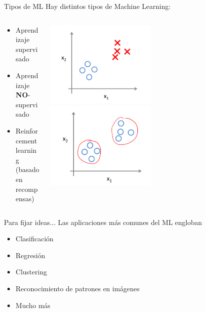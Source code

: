 \documentclass[11pt]{beamer}
\begin{document}
\begin{frame}{Tipos de ML}
Hay distintos tipos de Machine Learning:
\begin{columns}
\begin{column}{0.3\textwidth}
    \begin{itemize}[<+->]
        \item Aprendizaje supervisado
        \item Aprendizaje \textbf{NO}-supervisado
        \item Reinforcement learning (basado en recompensas)
    \end{itemize}
\end{column}
\begin{column}{0.7\textwidth}
\includegraphics[width=0.5\textwidth]{images/supervised.png}
\includegraphics[width=0.5\textwidth]{images/unsupervised.png}
\end{column}
\end{columns}
\end{frame}
\begin{frame}{Para fijar ideas...}
    Las aplicaciones m\'as comunes del ML engloban
    \begin{itemize}
        \item Clasificaci\'on
        \item Regresi\'on
        \item Clustering
        \item Reconocimiento de patrones en im\'agenes
        \item Mucho m\'as
    \end{itemize}
\end{frame}
\end{document}
